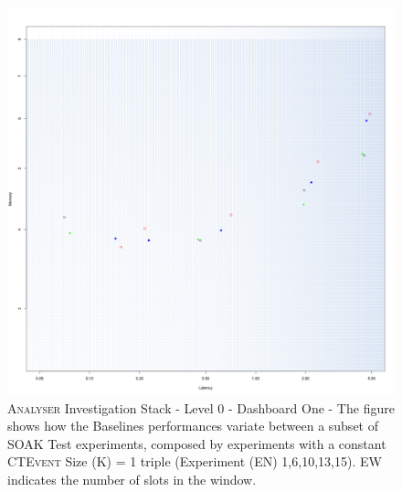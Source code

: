 \begin{figure}[h!tb]
	\centering
	\includegraphics[width=0.85\linewidth]{images/dashboard-1}	
	\caption[\textsc{Analyser} Investigation Stack - Level 0 - Dashboard One - Multiplot Version]{\textsc{Analyser} Investigation Stack - Level 0 - Dashboard One - The figure shows how the Baselines performances variate between a subset of SOAK Test experiments, composed by experiments with a constant \textsc{CTEvent} Size (K) = 1 triple (Experiment (EN) 1,6,10,13,15). EW indicates the number of slots in the window.} 
	\label{fig:result_dashboard_kb}
\end{figure}

